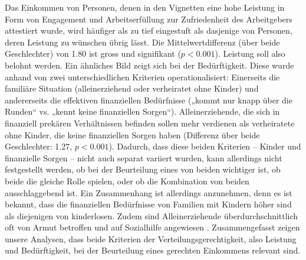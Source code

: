 \documentclass[a4paper,12pt]{article}
\renewcommand{\baselinestretch}{1.1}
\newif\ifcomments
\newcommand{\comment}[1]{%
    \ifcomments\marginpar{\renewcommand{\baselinestretch}{1}\tiny\hspace*{-1.1em}\colorbox{gray!20}%
    {\textcolor{red}{\parbox[t]{.9in}{\raggedright #1}}}}\fi}
\begin{document}
Das Einkommen von Personen, denen in den Vignetten eine hohe Leistung in Form
von Engagement und Arbeitserfüllung zur Zufriedenheit des Arbeitgebers
attestiert wurde, wird häufiger als zu tief eingestuft als dasjenige von
Personen, deren Leistung zu wünschen übrig lässt. Die Mittelwertdifferenz (über
beide Geschlechter) \comment{die Werte über beide Geschlechter werden gar nirgends dargestellt, der Konsistenz wegen immer getrennt berichten? Siehe auch weiter unten} von 1.80 ist gross und signifikant ($p<0.001$). Leistung
soll also belohnt werden. Ein ähnliches Bild zeigt sich bei der Bedürftigkeit.
Diese wurde anhand von zwei unterschiedlichen Kriterien operationalisiert:
Einerseits die familiäre Situation (alleinerziehend oder verheiratet ohne
Kinder) und andererseits die effektiven finanziellen Bedürfnisse („kommt nur
knapp über die Runden“ vs. „kennt keine finanziellen Sorgen“).
Alleinerziehende, die sich in finanziell prekären Verhältnissen befinden sollen
mehr verdienen als verheiratete ohne Kinder, die keine finanziellen Sorgen
haben (Differenz über beide Geschlechter: 1.27, $p<0.001$). Dadurch, dass diese
beiden Kriterien – Kinder und finanzielle Sorgen – nicht auch separat variiert
wurden, kann allerdings nicht festgestellt werden, ob bei der Beurteilung eines
von beiden wichtiger ist, ob beide die gleiche Rolle spielen, oder ob die
Kombination von beiden ausschlaggebend ist. Ein Zusammenhang ist allerdings
anzunehmen, denn es ist bekannt, dass die finanziellen Bedürfnisse von Familien
mit Kindern höher sind als diejenigen von kinderlosen. Zudem sind
Alleinerziehende überdurchschnittlich oft von Armut betroffen und auf
Sozialhilfe angewiesen \citep{Amacker-etal-2015}. Zusammengefasst zeigen unsere
Analysen, dass beide Kriterien der Verteilungsgerechtigkeit, also Leistung und
Bedürftigkeit, bei der Beurteilung eines gerechten Einkommens relevant sind.

\end{document}
